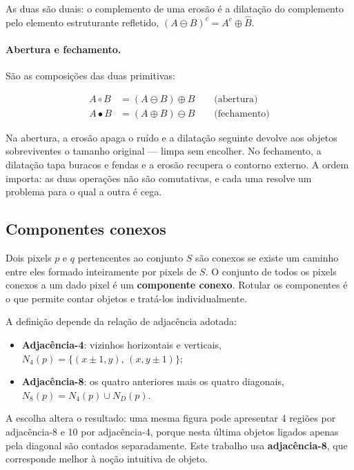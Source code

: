 \documentclass[12pt,a4paper]{article}
\begin{document}
As duas são duais: o complemento de uma erosão é a dilatação do complemento
pelo elemento estruturante refletido, $(A \ominus B)^c = A^c \oplus \hat{B}$.

\paragraph{Abertura e fechamento.} São as composições das duas primitivas:

\begin{align}
A \circ B &= (A \ominus B) \oplus B \qquad \text{(abertura)} \\
A \bullet B &= (A \oplus B) \ominus B \qquad \text{(fechamento)}
\end{align}

Na abertura, a erosão apaga o ruído e a dilatação seguinte devolve aos objetos
sobreviventes o tamanho original --- limpa sem encolher. No fechamento, a
dilatação tapa buracos e fendas e a erosão recupera o contorno externo. A
ordem importa: as duas operações não são comutativas, e cada uma resolve um
problema para o qual a outra é cega.

\subsection{Componentes conexos}

Dois pixels $p$ e $q$ pertencentes ao conjunto $S$ são conexos se existe um
caminho entre eles formado inteiramente por pixels de $S$. O conjunto de todos
os pixels conexos a um dado pixel é um \textbf{componente conexo}. Rotular os
componentes é o que permite contar objetos e tratá-los individualmente.

A definição depende da relação de adjacência adotada:

\begin{itemize}
  \item \textbf{Adjacência-4}: vizinhos horizontais e verticais,
        $N_4(p) = \{(x{\pm}1,y),\,(x,y{\pm}1)\}$;
  \item \textbf{Adjacência-8}: os quatro anteriores mais os quatro diagonais,
        $N_8(p) = N_4(p) \cup N_D(p)$.
\end{itemize}

A escolha altera o resultado: uma mesma figura pode apresentar 4 regiões por
adjacência-8 e 10 por adjacência-4, porque nesta última objetos ligados apenas
pela diagonal são contados separadamente. Este trabalho usa
\textbf{adjacência-8}, que corresponde melhor à noção intuitiva de objeto.
\end{document}
